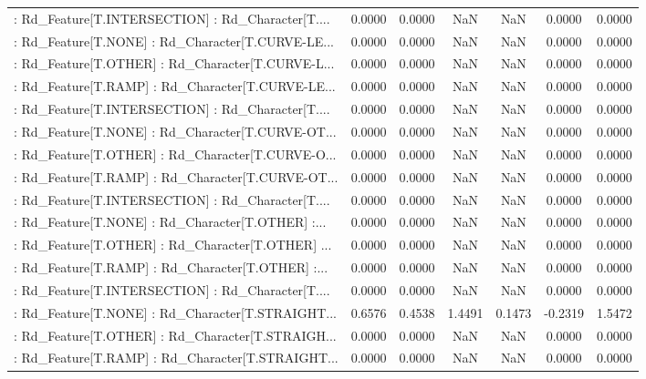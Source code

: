 \begin{longtable}{p{4cm}cccccc}
 : Rd\_Feature[T.INTERSECTION] : Rd\_Character[T.... &  0.0000 &    0.0000 &     NaN &          NaN &  0.0000 &  0.0000 \\
 : Rd\_Feature[T.NONE] : Rd\_Character[T.CURVE-LE... &  0.0000 &    0.0000 &     NaN &          NaN &  0.0000 &  0.0000 \\
 : Rd\_Feature[T.OTHER] : Rd\_Character[T.CURVE-L... &  0.0000 &    0.0000 &     NaN &          NaN &  0.0000 &  0.0000 \\
 : Rd\_Feature[T.RAMP] : Rd\_Character[T.CURVE-LE... &  0.0000 &    0.0000 &     NaN &          NaN &  0.0000 &  0.0000 \\
 : Rd\_Feature[T.INTERSECTION] : Rd\_Character[T.... &  0.0000 &    0.0000 &     NaN &          NaN &  0.0000 &  0.0000 \\
 : Rd\_Feature[T.NONE] : Rd\_Character[T.CURVE-OT... &  0.0000 &    0.0000 &     NaN &          NaN &  0.0000 &  0.0000 \\
 : Rd\_Feature[T.OTHER] : Rd\_Character[T.CURVE-O... &  0.0000 &    0.0000 &     NaN &          NaN &  0.0000 &  0.0000 \\
 : Rd\_Feature[T.RAMP] : Rd\_Character[T.CURVE-OT... &  0.0000 &    0.0000 &     NaN &          NaN &  0.0000 &  0.0000 \\
 : Rd\_Feature[T.INTERSECTION] : Rd\_Character[T.... &  0.0000 &    0.0000 &     NaN &          NaN &  0.0000 &  0.0000 \\
 : Rd\_Feature[T.NONE] : Rd\_Character[T.OTHER] :... &  0.0000 &    0.0000 &     NaN &          NaN &  0.0000 &  0.0000 \\
 : Rd\_Feature[T.OTHER] : Rd\_Character[T.OTHER] ... &  0.0000 &    0.0000 &     NaN &          NaN &  0.0000 &  0.0000 \\
 : Rd\_Feature[T.RAMP] : Rd\_Character[T.OTHER] :... &  0.0000 &    0.0000 &     NaN &          NaN &  0.0000 &  0.0000 \\
 : Rd\_Feature[T.INTERSECTION] : Rd\_Character[T.... &  0.0000 &    0.0000 &     NaN &          NaN &  0.0000 &  0.0000 \\
 : Rd\_Feature[T.NONE] : Rd\_Character[T.STRAIGHT... &  0.6576 &    0.4538 &  1.4491 &       0.1473 & -0.2319 &  1.5472 \\
 : Rd\_Feature[T.OTHER] : Rd\_Character[T.STRAIGH... &  0.0000 &    0.0000 &     NaN &          NaN &  0.0000 &  0.0000 \\
 : Rd\_Feature[T.RAMP] : Rd\_Character[T.STRAIGHT... &  0.0000 &    0.0000 &     NaN &          NaN &  0.0000 &  0.0000 \\

\end{longtable}
